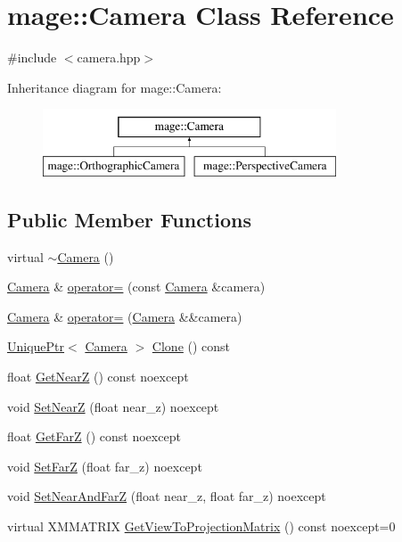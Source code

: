 \hypertarget{classmage_1_1_camera}{}\section{mage\+:\+:Camera Class Reference}
\label{classmage_1_1_camera}


{\ttfamily \#include $<$camera.\+hpp$>$}

Inheritance diagram for mage\+:\+:Camera\+:\begin{figure}[H]
\begin{center}
\leavevmode
\includegraphics[height=2.000000cm]{classmage_1_1_camera}
\end{center}
\end{figure}
\subsection*{Public Member Functions}
\begin{DoxyCompactItemize}
\item 
virtual \hyperlink{classmage_1_1_camera_aa4718c93578d160299bdc24039cc256f}{$\sim$\+Camera} ()
\item 
\hyperlink{classmage_1_1_camera}{Camera} \& \hyperlink{classmage_1_1_camera_a9ae561f9cc0ed0dd855ee1d824dad090}{operator=} (const \hyperlink{classmage_1_1_camera}{Camera} \&camera)
\item 
\hyperlink{classmage_1_1_camera}{Camera} \& \hyperlink{classmage_1_1_camera_a83e33f57394e85eee58745eb8e05b282}{operator=} (\hyperlink{classmage_1_1_camera}{Camera} \&\&camera)
\item 
\hyperlink{namespacemage_a3316d7143a973e37adf1110f2e80ca31}{Unique\+Ptr}$<$ \hyperlink{classmage_1_1_camera}{Camera} $>$ \hyperlink{classmage_1_1_camera_a830e9a071449f1026fd43fcd19577e6c}{Clone} () const
\item 
float \hyperlink{classmage_1_1_camera_a0f969370751ec76c51adf093f7bc092a}{Get\+NearZ} () const noexcept
\item 
void \hyperlink{classmage_1_1_camera_ace900f00ddce6060a627344257f417db}{Set\+NearZ} (float near\+\_\+z) noexcept
\item 
float \hyperlink{classmage_1_1_camera_ac4c8e8bbfb16068ab24a90e4a4788d15}{Get\+FarZ} () const noexcept
\item 
void \hyperlink{classmage_1_1_camera_ae5b70f109df3649d31e9e364080e9d72}{Set\+FarZ} (float far\+\_\+z) noexcept
\item 
void \hyperlink{classmage_1_1_camera_a1854150387f3bfff7cc526b296859a7e}{Set\+Near\+And\+FarZ} (float near\+\_\+z, float far\+\_\+z) noexcept
\item 
virtual X\+M\+M\+A\+T\+R\+IX \hyperlink{classmage_1_1_camera_ad72020c0bd6f8629bf8c8ba8bf583ed4}{Get\+View\+To\+Projection\+Matrix} () const noexcept=0
\end{DoxyCompactItemize}
